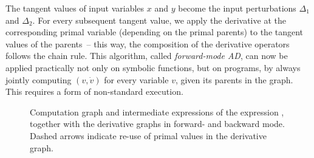 The tangent values of input variables \(x\) and \(y\) become the input perturbations \(\Delta_1\)
and \(\Delta_2\).  For every subsequent tangent value, we apply the derivative at the corresponding
primal variable (depending on the primal parents) to the tangent values of the parents~-- this way,
the composition of the derivative operators follows the chain rule.  This algorithm, called
\emph{forward-mode AD}, can now be applied practically not only on symbolic functions, but on
programs, by always jointly computing \((v, \dot{v})\) for every variable \(v\), given its parents
in the graph.  This requires a form of non-standard execution.

\begin{figure}[t]
  \centering
  \qquad
  \caption{Computation graph and intermediate expressions of the expression \protect{}, together with the derivative graphs in forward- and backward mode.  Dashed arrows
    indicate re-use of primal values in the derivative graph.}
  \label{fig:comp-graph-2}
\end{figure}

